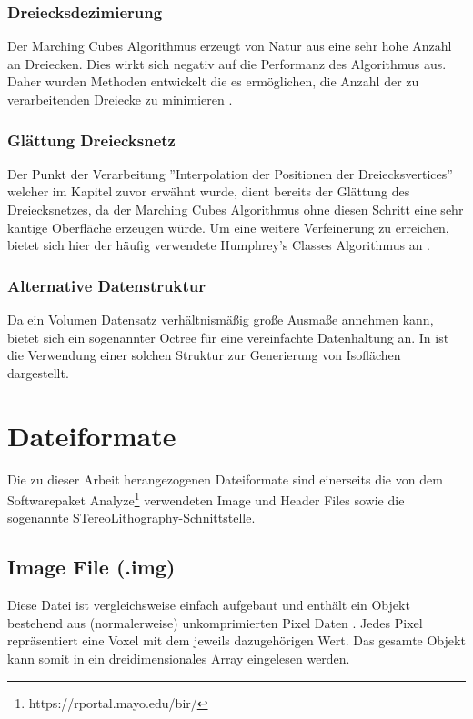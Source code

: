 \subsubsection{Dreiecksdezimierung}
Der Marching Cubes Algorithmus erzeugt von Natur aus eine sehr hohe Anzahl an Dreiecken. Dies wirkt sich negativ auf die Performanz des Algorithmus aus. Daher wurden Methoden entwickelt die es ermöglichen, die Anzahl der zu verarbeitenden Dreiecke zu minimieren \citep{DecTri}.
\subsubsection{Glättung Dreiecksnetz}
Der Punkt der Verarbeitung ''Interpolation der Positionen der Dreiecksvertices'' welcher im Kapitel zuvor erwähnt wurde, dient bereits der Glättung des Dreiecksnetzes, da der Marching Cubes Algorithmus ohne diesen Schritt eine sehr kantige Oberfläche erzeugen würde. Um eine weitere Verfeinerung zu erreichen, bietet sich hier der häufig verwendete Humphrey’s Classes Algorithmus an \citep{Verf} .
\subsubsection{Alternative Datenstruktur}
Da ein Volumen Datensatz verhältnismäßig große Ausmaße annehmen kann, bietet sich ein sogenannter Octree für eine vereinfachte Datenhaltung an. In \citep{Octree} ist die Verwendung einer solchen Struktur zur Generierung von Isoflächen dargestellt.

\section{Dateiformate}
\label{sec:DateiEinf}
Die zu dieser Arbeit herangezogenen Dateiformate sind einerseits die von dem Softwarepaket Analyze\footnote{https://rportal.mayo.edu/bir/} verwendeten Image und Header Files sowie die sogenannte STereoLithography-Schnittstelle. 

\subsection{Image File (.img)}
Diese Datei ist vergleichsweise einfach aufgebaut und enthält ein Objekt bestehend aus (normalerweise) unkomprimierten Pixel Daten \citep{AnalyzeFormat}. Jedes Pixel repräsentiert eine Voxel mit dem jeweils dazugehörigen Wert. Das gesamte Objekt kann somit in ein dreidimensionales Array eingelesen werden.

